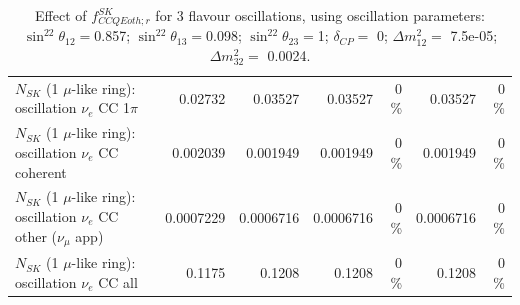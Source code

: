 \begin{table}
\begin{tabular}{| l | r | r | r  r | r  r |}
                     $N_{SK}$ (1 $\mu$-like ring): oscillation $\nu_e$ CC 1$\pi$ &         0.02732 &         0.03527 &         0.03527 &        0 \%  &         0.03527 &        0 \%  \\ 
                   $N_{SK}$ (1 $\mu$-like ring): oscillation $\nu_e$ CC coherent &        0.002039 &        0.001949 &        0.001949 &        0 \%  &        0.001949 &        0 \%  \\ 
      $N_{SK}$ (1 $\mu$-like ring): oscillation $\nu_e$ CC other ($\nu_\mu$ app) &       0.0007229 &       0.0006716 &       0.0006716 &        0 \%  &       0.0006716 &        0 \%  \\ 
                       $N_{SK}$ (1 $\mu$-like ring): oscillation $\nu_e$  CC all &          0.1175 &          0.1208 &          0.1208 &        0 \%  &          0.1208 &        0 \%  \\ 
\hline
\hline
\end{tabular}
\caption{ Effect of $f_{CCQEoth; r}^{SK}$ for 3 flavour oscillations, using oscillation parameters:  $\sin^22\theta_{12} = $0.857; $\sin^22\theta_{13} = $0.098; $\sin^22\theta_{23} = $1; $\delta_{CP} = $        0; $\Delta m^2_{12} = $    7.5e-05; $\Delta m^2_{32} = $    0.0024. }
\label{tab:num_sk_1Rmu_ccqe_other_eff_1RmuT_3f_osc_t13:0.098}
\end{table}
\clearpage
